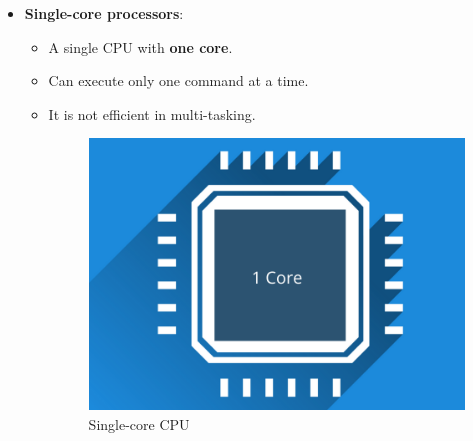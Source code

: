 \setlength{\columnsep}{3pt}
\begin{flushleft}

		\begin{itemize}
	\item \textbf{Single-core processors}: 
	\begin{itemize}
		\item A single CPU with \textbf{one core}.
		\item Can execute only one command at a time.
		\item It is not efficient in multi-tasking.
		\begin{figure}[h!]
			\centering
			\includegraphics[scale=.3]{content/chapter12/images/single.png}
			\caption{Single-core CPU}
			\label{fig:single-core1}
		\end{figure}
	\end{itemize}
	
	\bigskip
	

\end{itemize}
\end{flushleft}
